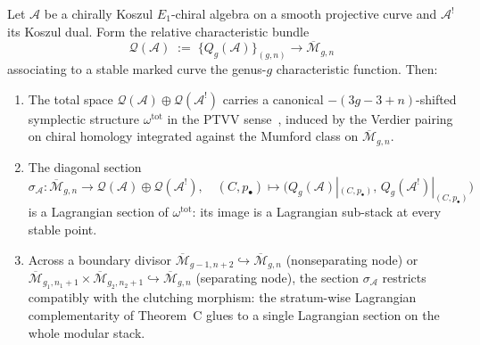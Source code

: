 \documentclass[11pt]{article}
\begin{document}
\begin{theorem}
\label{thm:theoremC-total-shifted-symplectic}
Let $\mathcal{A}$ be a chirally Koszul $E_1$-chiral algebra on a
smooth projective curve and $\mathcal{A}^!$ its Koszul dual. Form
the relative characteristic bundle
\[
  \mathcal{Q}(\mathcal{A}) \;:=\;
  \bigl\{Q_g(\mathcal{A})\bigr\}_{(g,n)} \longrightarrow
  \overline{\mathcal{M}}_{g,n}
\]
associating to a stable marked curve the genus-$g$ characteristic
function. Then:
\begin{enumerate}
\item\label{tsc-i} The total space
  $\mathcal{Q}(\mathcal{A}) \oplus \mathcal{Q}(\mathcal{A}^!)$
  carries a canonical $-(3g{-}3{+}n)$-shifted symplectic structure
  $\omega^{\mathrm{tot}}$ in the PTVV
  sense~\cite{PTVV13}, induced by the Verdier pairing on chiral
  homology integrated against the Mumford class on
  $\overline{\mathcal{M}}_{g,n}$.
\item\label{tsc-ii} The diagonal section
  $\sigma_{\mathcal{A}}\colon
   \overline{\mathcal{M}}_{g,n} \longrightarrow
   \mathcal{Q}(\mathcal{A}) \oplus \mathcal{Q}(\mathcal{A}^!),
   \quad
   (C, p_\bullet) \mapsto
   \bigl(Q_g(\mathcal{A})|_{(C,p_\bullet)},\,
         Q_g(\mathcal{A}^!)|_{(C,p_\bullet)}\bigr)$
  is a Lagrangian section of $\omega^{\mathrm{tot}}$: its image is a
  Lagrangian sub-stack at every stable point.
\item\label{tsc-iii} Across a boundary divisor
  $\overline{\mathcal{M}}_{g-1,n+2} \hookrightarrow
   \overline{\mathcal{M}}_{g,n}$ (nonseparating node) or
  $\overline{\mathcal{M}}_{g_1,n_1+1} \times
   \overline{\mathcal{M}}_{g_2,n_2+1}
   \hookrightarrow \overline{\mathcal{M}}_{g,n}$ (separating node),
  the section $\sigma_{\mathcal{A}}$ restricts compatibly with the
  clutching morphism: the stratum-wise Lagrangian complementarity
  of Theorem~C glues to a single Lagrangian section on the whole
  modular stack.
\end{enumerate}
\end{theorem}
\end{document}
